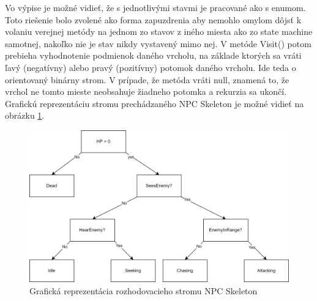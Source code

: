 \documentclass[slovak, master]{diploma}
\begin{document}
Vo výpise je možné vidieť, že s jednotlivými stavmi je pracované ako s enumom. Toto riešenie bolo zvolené ako forma zapuzdrenia aby nemohlo omylom dôjsť k volaniu verejnej metódy na jednom zo stavov z iného miesta ako zo state machine samotnej, nakoľko nie je stav nikdy vystavený mimo nej. V metóde Visit() potom prebieha vyhodnotenie podmienok daného vrcholu, na základe ktorých sa vráti ľavý (negatívny) alebo pravý (pozitívny) potomok daného vrcholu. Ide teda o orientovaný binárny strom. V prípade, že metóda vráti null, znamená to, že vrchol ne tomto mieste neobsahuje žiadneho potomka a rekurzia sa ukončí. Grafickú reprezentáciu stromu prechádzaného NPC Skeleton je možné vidieť na obrázku \ref{pic:treeGraph}.

\begin{figure}[!htbp]
    \centering
    \includegraphics[width=1\textwidth]{Figures/Trees.png}
    \caption{Grafická reprezentácia rozhodovacieho stromu NPC Skeleton}
    \label{pic:treeGraph}
\end{figure}
\end{document}
